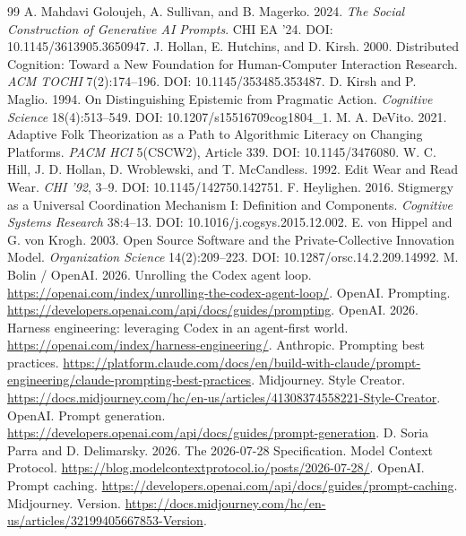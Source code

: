 \documentclass[11pt]{article}
\begin{document}
\begin{thebibliography}{99}
 A. Mahdavi Goloujeh, A. Sullivan, and B. Magerko. 2024. \emph{The Social Construction of Generative AI Prompts}. CHI EA '24. DOI: 10.1145/3613905.3650947.
 J. Hollan, E. Hutchins, and D. Kirsh. 2000. Distributed Cognition: Toward a New Foundation for Human-Computer Interaction Research. \emph{ACM TOCHI} 7(2):174--196. DOI: 10.1145/353485.353487.
 D. Kirsh and P. Maglio. 1994. On Distinguishing Epistemic from Pragmatic Action. \emph{Cognitive Science} 18(4):513--549. DOI: 10.1207/s15516709cog1804\_1.
 M. A. DeVito. 2021. Adaptive Folk Theorization as a Path to Algorithmic Literacy on Changing Platforms. \emph{PACM HCI} 5(CSCW2), Article 339. DOI: 10.1145/3476080.
 W. C. Hill, J. D. Hollan, D. Wroblewski, and T. McCandless. 1992. Edit Wear and Read Wear. \emph{CHI '92}, 3--9. DOI: 10.1145/142750.142751.
 F. Heylighen. 2016. Stigmergy as a Universal Coordination Mechanism I: Definition and Components. \emph{Cognitive Systems Research} 38:4--13. DOI: 10.1016/j.cogsys.2015.12.002.
 E. von Hippel and G. von Krogh. 2003. Open Source Software and the Private-Collective Innovation Model. \emph{Organization Science} 14(2):209--223. DOI: 10.1287/orsc.14.2.209.14992.
 M. Bolin / OpenAI. 2026. Unrolling the Codex agent loop. \url{https://openai.com/index/unrolling-the-codex-agent-loop/}.
 OpenAI. Prompting. \url{https://developers.openai.com/api/docs/guides/prompting}.
 OpenAI. 2026. Harness engineering: leveraging Codex in an agent-first world. \url{https://openai.com/index/harness-engineering/}.
 Anthropic. Prompting best practices. \url{https://platform.claude.com/docs/en/build-with-claude/prompt-engineering/claude-prompting-best-practices}.
 Midjourney. Style Creator. \url{https://docs.midjourney.com/hc/en-us/articles/41308374558221-Style-Creator}.
 OpenAI. Prompt generation. \url{https://developers.openai.com/api/docs/guides/prompt-generation}.
 D. Soria Parra and D. Delimarsky. 2026. The 2026-07-28 Specification. Model Context Protocol. \url{https://blog.modelcontextprotocol.io/posts/2026-07-28/}.
 OpenAI. Prompt caching. \url{https://developers.openai.com/api/docs/guides/prompt-caching}.
 Midjourney. Version. \url{https://docs.midjourney.com/hc/en-us/articles/32199405667853-Version}.
\end{thebibliography}
\end{document}
